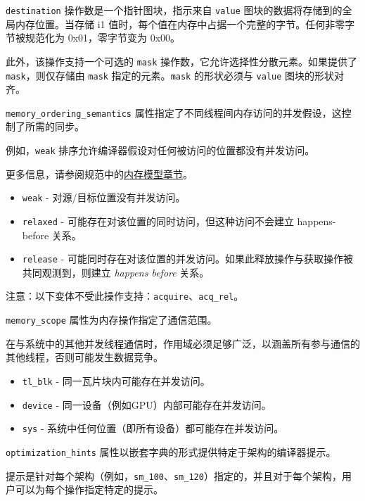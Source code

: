 \documentclass{article}
\begin{document}
\texttt{destination} 操作数是一个指针图块，指示来自 \texttt{value} 图块的数据将存储到的全局内存位置。当存储 i1 值时，每个值在内存中占据一个完整的字节。任何非零字节被规范化为 0x01，零字节变为 0x00。


此外，该操作支持一个可选的 \texttt{mask} 操作数，它允许选择性分散元素。如果提供了 \texttt{mask}，则仅存储由 \texttt{mask} 指定的元素。\texttt{mask} 的形状必须与 \texttt{value} 图块的形状对齐。


\texttt{memory\_ordering\_semantics} 属性指定了不同线程间内存访问的并发假设，这控制了所需的同步。

例如，\texttt{weak} 排序允许编译器假设对任何被访问的位置都没有并发访问。

更多信息，请参阅规范中的\href{https://docs.nvidia.com/cuda/tile-ir/latest/sections/memory_model.html#section-memory-model}{内存模型章节}。


\begin{itemize}
\item \texttt{weak} - 对源/目标位置没有并发访问。
\item \texttt{relaxed} - 可能存在对该位置的同时访问，但这种访问不会建立 happens-before 关系。
\item \texttt{release} - 可能同时存在对该位置的并发访问。如果此释放操作与获取操作被共同观测到，则建立 \textit{happens before} 关系。

\end{itemize}
注意：以下变体不受此操作支持：\texttt{acquire}、\texttt{acq\_rel}。


\texttt{memory\_scope} 属性为内存操作指定了通信范围。

在与系统中的其他并发线程通信时，作用域必须足够广泛，以涵盖所有参与通信的其他线程，否则可能发生数据竞争。


\begin{itemize}
\item \texttt{tl\_blk} - 同一瓦片块内可能存在并发访问。
\item \texttt{device} - 同一设备（例如GPU）内部可能存在并发访问。
\item \texttt{sys} - 系统中任何位置（即所有设备）都可能存在并发访问。

\end{itemize}
\texttt{optimization\_hints} 属性以嵌套字典的形式提供特定于架构的编译器提示。


提示是针对每个架构（例如，\texttt{sm\_100}、\texttt{sm\_120}）指定的，并且对于每个架构，用户可以为每个操作指定特定的提示。
\end{document}
